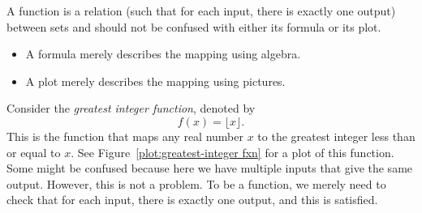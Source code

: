 \documentclass{ximera}
\begin{document}
\begin{warning}
A function is a relation (such that for each input, there is exactly one
output) between sets and should not be confused with either its
formula or its plot.
\begin{itemize}
\item A formula merely describes the mapping using algebra.
\item A plot merely describes the mapping using pictures. 
\end{itemize}
\end{warning}

\begin{image}
\end{image}



\begin{example}
Consider the \textit{greatest integer function}, denoted by
\[
f(x) = \lfloor x \rfloor.
\]
This is the function that maps any real number $x$ to the greatest
integer less than or equal to $x$. See Figure~\ref{plot:greatest-integer fxn} for a plot of
this function. Some might be confused because here we have multiple
inputs that give the same output. However, this is not a problem. To
be a function, we merely need to check that for each input, there is exactly
one output, and this is satisfied.
\end{example}
\end{document}
